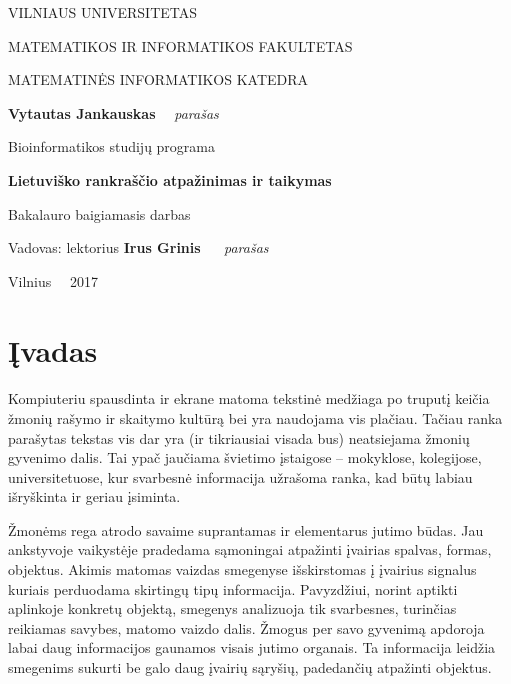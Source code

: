 \documentclass[a4paper,12pt]{article}
\begin{document}
\thispagestyle{empty} %

\begin{center}
 VILNIAUS UNIVERSITETAS 
 
MATEMATIKOS IR INFORMATIKOS FAKULTETAS

MATEMATINĖS INFORMATIKOS KATEDRA

\vspace{4cm}

\textbf{Vytautas Jankauskas} \ \ \textit{parašas}

Bioinformatikos studijų programa


\vspace{3cm}

\textbf{\Large Lietuviško rankraščio atpažinimas ir taikymas}

Bakalauro baigiamasis darbas 

\vspace{4cm}

Vadovas: lektorius \textbf{Irus Grinis} \ \   \textit{ parašas}

\vfill

Vilnius \ \  2017
\end{center}

\clearpage

\tableofcontents
\clearpage

\section*{Įvadas}

\paragraph{}Kompiuteriu spausdinta ir ekrane matoma tekstinė medžiaga po truputį keičia žmonių rašymo ir skaitymo kultūrą bei yra naudojama vis plačiau. Tačiau ranka parašytas tekstas vis dar yra (ir tikriausiai visada bus) neatsiejama žmonių gyvenimo dalis. Tai ypač jaučiama švietimo įstaigose – mokyklose, kolegijose, universitetuose, kur svarbesnė informacija užrašoma ranka, kad būtų labiau išryškinta ir geriau įsiminta.

Žmonėms rega atrodo savaime suprantamas ir elementarus jutimo būdas. Jau ankstyvoje vaikystėje pradedama sąmoningai atpažinti įvairias spalvas, formas, objektus. Akimis matomas vaizdas smegenyse išskirstomas į įvairius signalus kuriais perduodama skirtingų tipų informacija. Pavyzdžiui, norint aptikti aplinkoje konkretų objektą, smegenys analizuoja tik svarbesnes, turinčias reikiamas savybes, matomo vaizdo dalis. Žmogus per savo gyvenimą apdoroja labai daug informacijos gaunamos visais jutimo organais. Ta informacija leidžia smegenims sukurti be galo daug įvairių sąryšių, padedančių atpažinti objektus.
\end{document}
